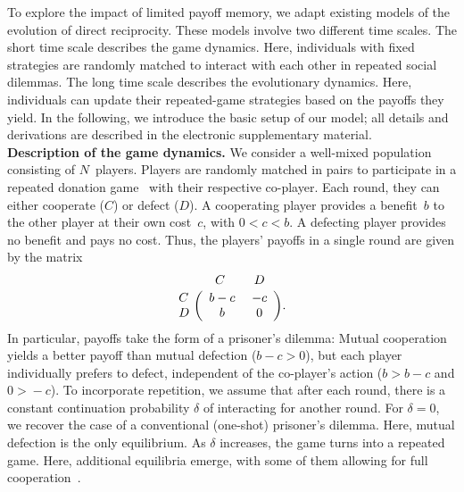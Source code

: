 \documentclass[11pt]{article}
\def\esm{electronic supplementary material}
\theoremstyle{plainCl1}
\theoremstyle{plainCl2}
\begin{document}

To explore the impact of limited payoff memory, we adapt existing models of the evolution of direct reciprocity.
These models involve two different time scales. 
The short time scale describes the game dynamics. 
Here, individuals with fixed strategies are randomly matched to interact with each other in repeated social dilemmas. 
The long time scale describes the evolutionary dynamics. 
Here, individuals can update their repeated-game strategies based on the payoffs they yield. 
In the following, we introduce the basic setup of our model; all details and derivations are described in the \esm.\\


\noindent
{\bf Description of the game dynamics.} We consider a well-mixed population consisting of $N$~players.
Players are randomly matched in pairs to participate in a repeated donation game~\citep{sigmund2010calculus} with their respective co-player.
Each round, they can either cooperate (\(C\)) or defect (\(D\)). 
A cooperating player provides a benefit~\(b\) to the other player at their own cost~\(c\), with \(0 \!<\! c \!<\! b\). 
A defecting player provides no benefit and pays no cost. 
Thus, the players' payoffs in a single round are given by the matrix
\begin{equation}
\bordermatrix{%
	& C & D \cr
C &\ b-c &\ -c\  \cr
D &\ b &\ 0\ \cr
} .
\end{equation}
In particular, payoffs take the form of a prisoner's dilemma:
Mutual cooperation yields a better payoff than mutual defection ($b\!-\!c\!>\!0$), but each player individually prefers to defect, independent of the co-player's action ($b\!>\!b\!-\!c$ and $0\!>\!-c$). 
To incorporate repetition, we assume that after each round, there is a constant continuation probability $\delta$ of interacting for another round. 
For $\delta\!=\!0$, we recover the case of a conventional (one-shot) prisoner's dilemma. 
Here, mutual defection is the only equilibrium. 
As $\delta$ increases, the game turns into a repeated game. Here, additional equilibria emerge, with some of them allowing for full cooperation~\citep{friedman:RES:1971,Akin:chapter:2016,hilbe:GEB:2015,stewart:pnas:2014}. 


\end{document}
